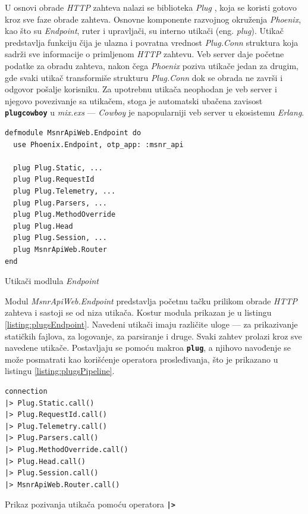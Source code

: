 \documentclass[12pt,oneside]{memoir}
\begin{document}
U osnovi obrade \emph{HTTP} zahteva nalazi se biblioteka \emph{Plug} \cite{plug}, koja se koristi gotovo kroz sve faze obrade zahteva.
Osnovne komponente razvojnog okruženja \emph{Phoenix}, kao što su \emph{Endpoint}, ruter i upravljači, su interno utikači (eng. \emph{plug}).
Utikač predstavlja funkciju čija je ulazna i povratna vrednost \emph{Plug.Conn} struktura koja sadrži sve informacije o
primljenom \emph{HTTP} zahtevu. Veb server daje početne podatke za obradu zahteva, nakon čega \emph{Phoenix} poziva utikače jedan za drugim,
gde svaki utikač transformiše strukturu \emph{Plug.Conn} dok se obrada ne završi i odgovor pošalje korisniku. Za upotrebnu utikača neophodan je
veb server i njegovo povezivanje sa utikačem, stoga je automatski ubačena zavisost \texttt{\textbf{plug{\textunderscore}cowboy}} u \emph{mix.exs}
--- \emph{Cowboy} je napopularniji veb server u ekosistemu \emph{Erlang}.

\begin{listing}[!ht]
\begin{verbatim}
defmodule MsnrApiWeb.Endpoint do
  use Phoenix.Endpoint, otp_app: :msnr_api

  plug Plug.Static, ...
  plug Plug.RequestId
  plug Plug.Telemetry, ...
  plug Plug.Parsers, ...
  plug Plug.MethodOverride
  plug Plug.Head
  plug Plug.Session, ...
  plug MsnrApiWeb.Router
end
\end{verbatim}
\caption{Utikači modlula \emph{Endpoint}}
\label{listing:plugsEndpoint}
\end{listing}
Modul \emph{MsnrApiWeb.Endpoint} predstavlja početnu tačku prilikom obrade \emph{HTTP} zahteva i sastoji se od niza utikača. Kostur
modula prikazan je u listingu \ref{listing:plugsEndpoint}. Navedeni utikači imaju različite uloge --- za prikazivanje statičkih fajlova, za logovanje,
za parsiranje i druge. Svaki zahtev prolazi kroz sve navedene utikače. Postavljaju se pomoću makroa \texttt{\textbf{plug}}, a njihovo
navođenje se može posmatrati kao korišćenje operatora prosleđivanja, što je prikazano u listingu \ref{listing:plugsPipeline}.
\begin{listing}[!h]
\begin{verbatim}
connection
|> Plug.Static.call()
|> Plug.RequestId.call()
|> Plug.Telemetry.call()
|> Plug.Parsers.call()
|> Plug.MethodOverride.call()
|> Plug.Head.call()
|> Plug.Session.call()
|> MsnrApiWeb.Router.call()
\end{verbatim}
\caption{Prikaz pozivanja utikača pomoću operatora \texttt{\textbf{|>}}}
\label{listing:plugsPipeline}
\end{listing}
\end{document}
